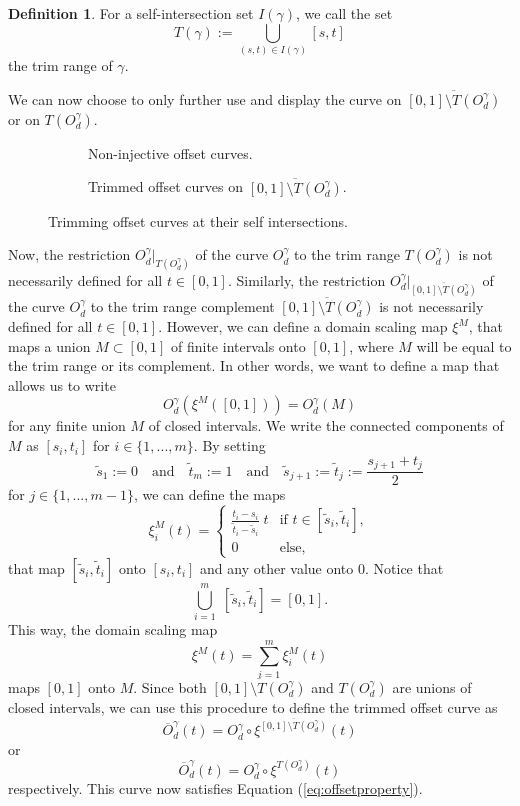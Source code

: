 \documentclass[a4paper, 11pt]{report}
\theoremstyle{definition}
\newtheorem{definition}{Definition}[section]
\newcommand{\domrestr}{\big|}
\begin{document}
	\begin{definition}
		For a self-intersection set $I(\gamma)$, we call the set
			$$T(\gamma) := \bigcup_{(s,t) \in I(\gamma)} [s,t]$$
		the trim range of $\gamma$.
	\end{definition}

	We can now choose to only further use and display the curve on $\overline{[0,1] \setminus T(O^\gamma_d)}$ or on $T(O^\gamma_d)$.

	\begin{figure}[H]
		\centering
		\begin{subfigure}{0.49\textwidth}
			
			\caption{Non-injective offset curves.}
		\end{subfigure}
		\begin{subfigure}{0.49\textwidth}
			
			\caption{Trimmed offset curves on $\overline{[0,1] \setminus T(O^\gamma_d)}$.}
		\end{subfigure}
		\caption{Trimming offset curves at their self intersections.}
	\end{figure}

	Now, the restriction $O^{\gamma}_d \domrestr_{T(O^\gamma_d)}$ of the curve $O^{\gamma}_d$ to the trim range $T(O^\gamma_d)$ is not necessarily defined for all $t \in [0,1]$. Similarly, the restriction $O^{\gamma}_d \domrestr_{\overline{[0,1] \setminus T(O^\gamma_d)}}$ of the curve $O^{\gamma}_d$ to the trim range complement $\overline{[0,1] \setminus T(O^\gamma_d)}$ is not necessarily defined for all $t \in [0,1]$. However, we can define a domain scaling map $\xi^M$, that maps a union $M \subset [0,1]$ of finite intervals onto $[0,1]$, where $M$ will be equal to the trim range or its complement. In other words, we want to define a map that allows us to write
		$$O^{\gamma}_d(\xi^M([0,1])) = O^{\gamma}_d (M)$$
	for any finite union $M$ of closed intervals.
	We write the connected components of $M$ as $[s_i, t_i]$ for $i \in \{1,...,m\}$. By setting
		$$ \tilde s_1 := 0 \quad\text{and}\quad \tilde t_m := 1 \quad\text{and}\quad \tilde s_{j+1} := \tilde t_j := \frac{s_{j+1} + t_j}{2} $$
	for $j \in \{1,...,m-1\}$, we can define the maps
		$$ \xi^M_i(t) = 
				\begin{cases}
					\frac{t_i - s_i}{\tilde t_i - \tilde s_i} \; t 	&\text{if } t \in [\tilde s_i, \tilde t_i], \\
					0 												&\text{else},
				\end{cases}
		$$
	that map $[\tilde s_i, \tilde t_i]$ onto $[s_i, t_i]$ and any other value onto $0$. Notice that
		$$ \bigcup_{i=1}^m \; [\tilde s_i, \tilde t_i] = [0,1].$$
	This way, the domain scaling map
		$$ \xi^M(t) = \sum_{i=1}^m \xi^M_i(t) $$
	maps $[0,1]$ onto $M$. Since both $\overline{[0,1] \setminus T(O^\gamma_d)}$ and $T(O^\gamma_d)$ are unions of closed intervals, we can use this procedure to define the trimmed offset curve as
		$$ \overline{O}^\gamma_d (t) = O^\gamma_d \circ \xi^{\overline{[0,1] \setminus T(O^\gamma_d)}}(t)$$
	or 
		$$ \overline{O}^\gamma_d (t) = O^\gamma_d \circ \xi^{T(O^\gamma_d)}(t)$$
	respectively. This curve now satisfies Equation (\ref{eq:offsetproperty}).
\end{document}
